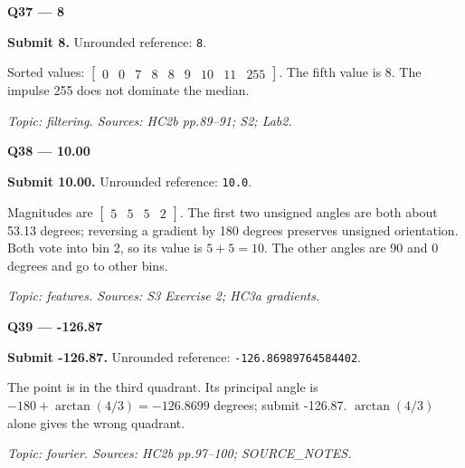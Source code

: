 \documentclass[11pt,a4paper]{article}
\begin{document}
\par\vspace{12pt}
\begin{minipage}{\linewidth}
\textbf{Q37 — 8}\par\smallskip
\textbf{Submit 8.} Unrounded reference: \texttt{8}.\par
Sorted values: \(\begin{bmatrix}0&0&7&8&8&9&10&11&255\end{bmatrix}\). The fifth value is 8. The impulse 255 does not dominate the median.\par
{\small\itshape Topic: filtering. Sources: HC2b pp.89–91; S2; Lab2.}

\end{minipage}
\par\vspace{12pt}
\begin{minipage}{\linewidth}
\textbf{Q38 — 10.00}\par\smallskip
\textbf{Submit 10.00.} Unrounded reference: \texttt{10.0}.\par
Magnitudes are \(\begin{bmatrix}5&5&5&2\end{bmatrix}\). The first two unsigned angles are both about 53.13 degrees; reversing a gradient by 180 degrees preserves unsigned orientation. Both vote into bin 2,\allowbreak{} so its value is \(5+5=10\). The other angles are 90 and 0 degrees and go to other bins.\par
{\small\itshape Topic: features. Sources: S3 Exercise 2; HC3a gradients.}

\end{minipage}
\par\vspace{12pt}
\begin{minipage}{\linewidth}
\textbf{Q39 — -126.87}\par\smallskip
\textbf{Submit -126.87.} Unrounded reference: \texttt{-126.86989764584402}.\par
The point is in the third quadrant. Its principal angle is \(-180+\arctan(4/3)=-126.8699\) degrees; submit -126.87. \(\arctan(4/3)\) alone gives the wrong quadrant.\par
{\small\itshape Topic: fourier. Sources: HC2b pp.97–100; SOURCE\_\allowbreak{}NOTES.}

\end{minipage}
\par\vspace{12pt}
\end{document}
